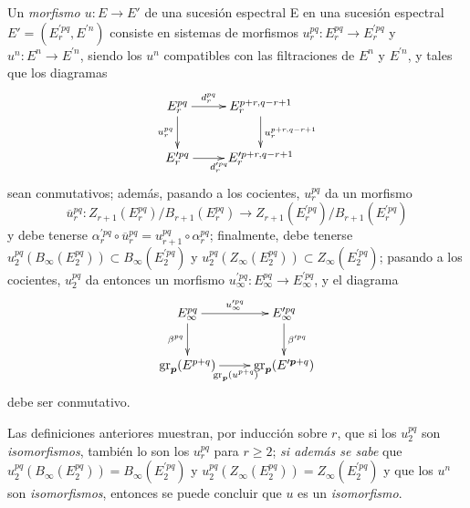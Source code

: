 \begin{env}[11.1.2]
\label{0.11.1.2}
\label{0.11.1.2-fr}
Un \emph{morfismo $u:E\to E'$} de una sucesión espectral E en una sucesión espectral $E'=(E_r^{\prime pq},E^{\prime n})$ consiste en sistemas de morfismos $u_r^{pq}:E_r^{pq}\to E_r^{\prime pq}$ y $u^n:E^n\to E^{\prime n}$, siendo los $u^n$ compatibles con las filtraciones de $E^n$ y $E^{\prime n}$, y tales que los diagramas
\[
  \xymatrix{
    E_r^{pq}\ar[r]^-{d_r^{pq}}\ar[d]_{u_r^{pq}} &
    E_r^{p+r,q-r+1}\ar[d]^{u_r^{p+r,q-r+1}}\\
    E_r^{\prime pq}\ar[r]_{d_r^{\prime pq}} &
    E_r^{\prime p+r,q-r+1}
  }
\]
sean conmutativos; además, pasando a los cocientes, $u_r^{pq}$ da un morfismo \[
  \overline u_r^{pq}:
  Z_{r+1}(E_r^{pq})/B_{r+1}(E_r^{pq})\longrightarrow
  Z_{r+1}(E_r^{\prime pq})/B_{r+1}(E_r^{\prime pq})
\] y debe tenerse $\alpha_r^{\prime pq}\circ\overline u_r^{pq}
=u_{r+1}^{pq}\circ\alpha_r^{pq}$; finalmente, debe tenerse $u_2^{pq}(B_\infty(E_2^{pq}))\subset B_\infty(E_2^{\prime pq})$ y $u_2^{pq}(Z_\infty(E_2^{pq}))\subset Z_\infty(E_2^{\prime pq})$; pasando a los cocientes, $u_2^{pq}$ da entonces un morfismo $u_\infty^{\prime pq}:E_\infty^{pq}\to E_\infty^{\prime pq}$, y el diagrama
\[
  \xymatrix{
    E_\infty^{pq}\ar[r]^-{u_\infty^{\prime pq}}\ar[d]_{\beta^{pq}} &
    E_\infty^{\prime pq}\ar[d]^{\beta^{\prime pq}}\\
    \operatorname{gr}_{\boldsymbol{p}}(E^{p+q})
      \ar[r]_{\operatorname{gr}_{\boldsymbol{p}}(u^{p+q})} &
    \operatorname{gr}_{\boldsymbol{p}}(E^{\prime\boldsymbol{p}+q})
  }
\]
debe ser conmutativo.

Las definiciones anteriores muestran, por inducción sobre $r$, que si los $u_2^{pq}$ son \emph{isomorfismos}, también lo son los $u_r^{pq}$ para $r\geq2$; \emph{si además se sabe} que $u_2^{pq}(B_\infty(E_2^{pq}))=B_\infty(E_2^{\prime pq})$ y $u_2^{pq}(Z_\infty(E_2^{pq}))=Z_\infty(E_2^{\prime pq})$ y que los $u^n$ son \emph{isomorfismos}, entonces se puede concluir que $u$ es un \emph{isomorfismo}.
\end{env}

